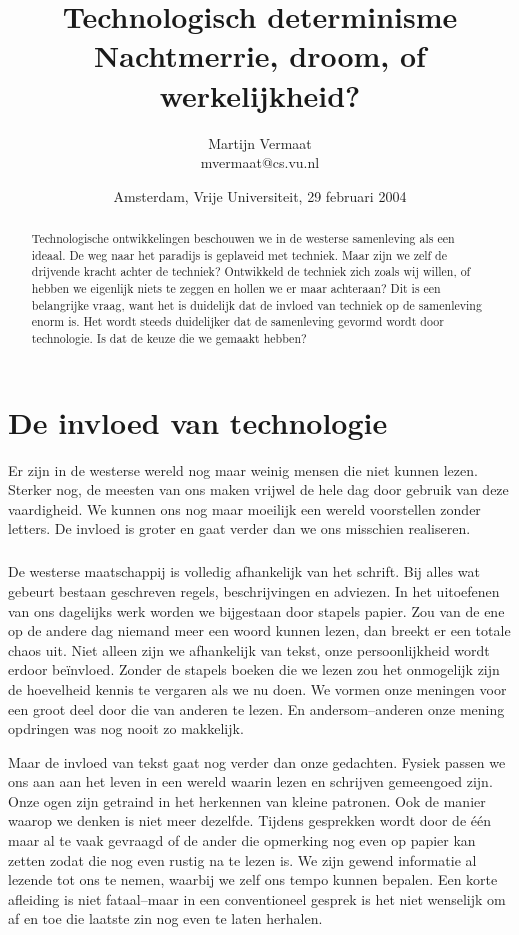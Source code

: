 \documentclass[11pt]{report}
\title{Technologisch determinisme \\ \small{Nachtmerrie, droom, of werkelijkheid?}}
\author{
    Martijn Vermaat \\ mvermaat@cs.vu.nl
}
\date{Amsterdam, Vrije Universiteit, 29 februari 2004}
\begin{document}
\maketitle


\begin{abstract}
Technologische ontwikkelingen beschouwen we in de westerse samenleving als een ideaal. De weg naar het paradijs is geplaveid met techniek. Maar zijn we zelf de drijvende kracht achter de techniek? Ontwikkeld de techniek zich zoals wij willen, of hebben we eigenlijk niets te zeggen en hollen we er maar achteraan? Dit is een belangrijke vraag, want het is duidelijk dat de invloed van techniek op de samenleving enorm is. Het wordt steeds duidelijker dat de samenleving gevormd wordt door technologie. Is dat de keuze die we gemaakt hebben?
\end{abstract}



\chapter{De invloed van technologie}

Er zijn in de westerse wereld nog maar weinig mensen die niet kunnen lezen. Sterker nog, de meesten van ons maken vrijwel de hele dag door gebruik van deze vaardigheid. We kunnen ons nog maar moeilijk een wereld voorstellen zonder letters. De invloed is groter en gaat verder dan we ons misschien realiseren.

\paragraph{}

De westerse maatschappij is volledig afhankelijk van het schrift. Bij alles wat gebeurt bestaan geschreven regels, beschrijvingen en adviezen. In het uitoefenen van ons dagelijks werk worden we bijgestaan door stapels papier. Zou van de ene op de andere dag niemand meer een woord kunnen lezen, dan breekt er een totale chaos uit. Niet alleen zijn we afhankelijk van tekst, onze persoonlijkheid wordt erdoor be\"invloed. Zonder de stapels boeken die we lezen zou het onmogelijk zijn de hoevelheid kennis te vergaren als we nu doen. We vormen onze meningen voor een groot deel door die van anderen te lezen. En andersom--anderen onze mening opdringen was nog nooit zo makkelijk.

Maar de invloed van tekst gaat nog verder dan onze gedachten. Fysiek passen we ons aan aan het leven in een wereld waarin lezen en schrijven gemeengoed zijn. Onze ogen zijn getraind in het herkennen van kleine patronen. Ook de manier waarop we denken is niet meer dezelfde. Tijdens gesprekken wordt door de \'e\'en maar al te vaak gevraagd of de ander die opmerking nog even op papier kan zetten zodat die nog even rustig na te lezen is. We zijn gewend informatie al lezende tot ons te nemen, waarbij we zelf ons tempo kunnen bepalen. Een korte afleiding is niet fataal--maar in een conventioneel gesprek is het niet wenselijk om af en toe die laatste zin nog even te laten herhalen.
\end{document}
